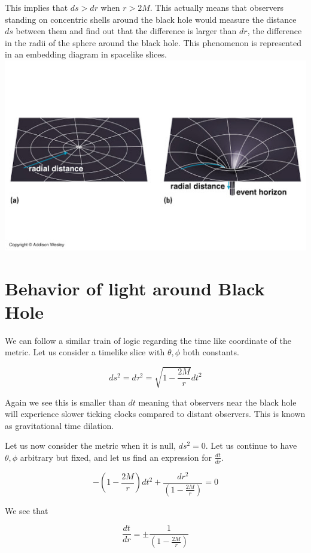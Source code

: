 \documentclass[10pt]{article}
\begin{document}
This implies that $ ds > dr $ when $r > 2M$. This actually means that observers standing on concentric shells around the black hole would measure the distance $ds$ between them and find out that the difference is larger than $dr$, the difference in the radii of the sphere around the black hole. This phenomenon is represented in an embedding diagram in spacelike slices. 
\includegraphics[scale=.5]{Figures/embed.jpg} 
\section{Behavior of light around Black Hole}

We can follow a similar train of logic regarding the time like  coordinate of the metric. Let us consider a timelike slice with $\theta,\phi$ both constants. 

\begin{equation}
ds^2 = d\tau^2 = \sqrt{1-\frac{2M}{r}} dt^2
\end{equation}

Again we see this is smaller than $dt$ meaning that observers near the black hole will experience slower ticking clocks compared to distant observers. This is known as gravitational time dilation. 

Let us now consider the metric when it is null, $ds^2 = 0$.  Let us continue to have $\theta,\phi$ arbitrary but fixed, and let us find an expression for $\frac{dt}{dr}$. 

\begin{equation}
- (1 - \frac{2M}{r})dt^2 + \frac{dr^2}{(1-\frac{2M}{r})} = 0 
\end{equation}

We see that 

\begin{equation}
\frac{dt}{dr} =  \pm \frac{1}{(1-\frac{2M}{r})}
\end{equation}
\end{document}
